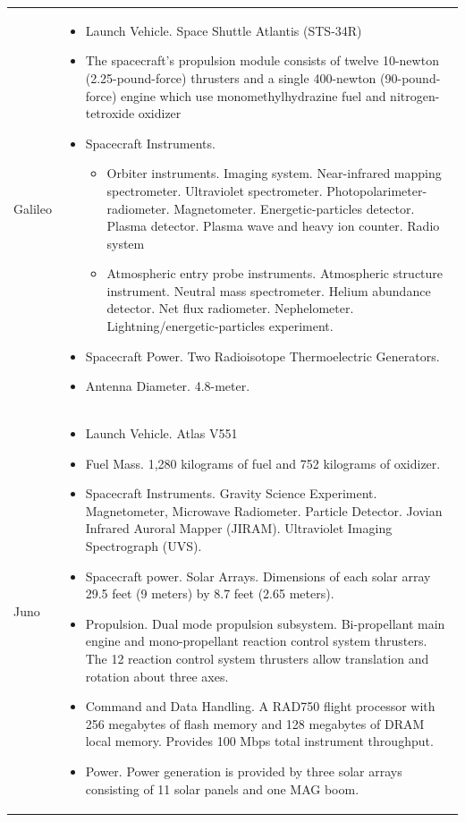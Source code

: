 \begin{supertabular}{p{.1\textwidth}p{.9\textwidth}}
  Galileo &
  \begin{itemize}
  \item Launch Vehicle. Space Shuttle Atlantis (STS-34R)
  \item The spacecraft's propulsion module consists of twelve
    10-newton (2.25-pound-force) thrusters and a single 400-newton
    (90-pound-force) engine which use monomethylhydrazine fuel and
    nitrogen-tetroxide oxidizer
  \item Spacecraft Instruments.
    \begin{itemize}
    \item Orbiter instruments. Imaging system. Near-infrared mapping
      spectrometer. Ultraviolet spectrometer.
      Photopolarimeter-radiometer. Magnetometer. Energetic-particles
      detector. Plasma detector. Plasma wave and heavy ion counter. Radio
      system
    \item Atmospheric entry probe instruments. Atmospheric structure
      instrument.  Neutral mass spectrometer. Helium abundance
      detector. Net flux
      radiometer. Nephelometer. Lightning/energetic-particles
      experiment.
    \end{itemize}
  \item Spacecraft Power. Two Radioisotope Thermoelectric Generators.
  \item Antenna Diameter. 4.8-meter.
  \end{itemize} \\

  Juno &
  \begin{itemize}
  \item Launch Vehicle. Atlas V551
  \item Fuel Mass. 1,280 kilograms of fuel and 752 kilograms of
    oxidizer.
  \item Spacecraft Instruments. Gravity Science Experiment.
    Magnetometer, Microwave Radiometer. Particle Detector. Jovian
    Infrared Auroral Mapper (JIRAM). Ultraviolet Imaging Spectrograph
    (UVS).
  \item Spacecraft power. Solar Arrays. Dimensions of each solar array
    29.5 feet (9 meters) by 8.7 feet (2.65 meters).
  \item Propulsion. Dual mode propulsion subsystem. Bi-propellant main
    engine and mono-propellant reaction control system thrusters. The
    12 reaction control system thrusters allow translation and
    rotation about three axes.
  \item Command and Data Handling. A RAD750 flight processor with 256
    megabytes of flash memory and 128 megabytes of DRAM local
    memory. Provides 100 Mbps total instrument throughput.
  \item Power. Power generation is provided by three solar arrays
    consisting of 11 solar panels and one MAG boom.
  \end{itemize} \\


\end{supertabular}

